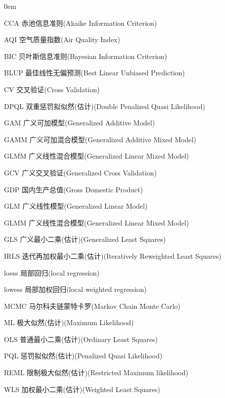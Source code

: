 \begin{denotation}
\itemsep 0em

\item [CCA] 赤池信息准则(Akaike Information Criterion)
\item [AQI] 空气质量指数(Air Quality Index)
\item [BIC] 贝叶斯信息准则(Bayesian Information Criterion)
\item [BLUP] 最佳线性无偏预测(Best Linear Unbiased Prediction)
\item [CV] 交叉验证(Cross Validation)
\item [DPQL] 双重惩罚拟似然(估计)(Double Penalized Quasi Likelihood)
\item [GAM] 广义可加模型(Generalized Additive Model)
\item [GAMM] 广义可加混合模型(Generalized Additive Mixed Model)
\item [GLMM] 广义线性混合模型(Generalized Linear Mixed Model)
\item [GCV] 广义交叉验证(Generalized Cross Validation)
\item [GDP] 国内生产总值(Gross Domestic Product)
\item [GLM] 广义线性模型(Generalized Linear Model)
\item [GLMM] 广义线性混合模型(Generalized Linear Mixed Model)
\item [GLS] 广义最小二乘(估计)(Generalized Least Squares)
\item [IRLS] 迭代再加权最小二乘(估计)(Iteratively Reweighted Least Squares)
\item [loess] 局部回归(local regression)
\item [lowess] 局部加权回归(local weighted regression)
\item [MCMC] 马尔科夫链蒙特卡罗(Markov Chain Monte Carlo)
\item [ML] 极大似然(估计)(Maximum Likelihood)
\item [OLS] 普通最小二乘(估计)(Ordinary Least Squares)
\item [PQL] 惩罚拟似然(估计)(Penalized Quasi Likelihood)
\item [REML] 限制极大似然(估计)(Restricted Maximum likelihood)
\item [WLS] 加权最小二乘(估计)(Weighted Least Squares)

\end{denotation}
